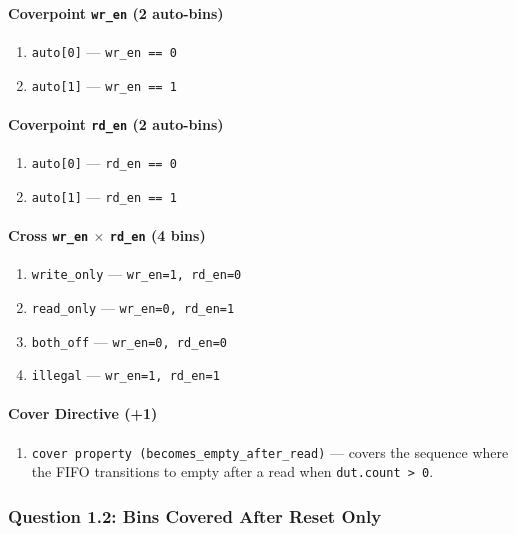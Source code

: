 \documentclass[11pt]{article}
\begin{document}
\paragraph*{Coverpoint \texttt{wr\_en} (2 auto-bins)}
\begin{enumerate}[resume, label=\arabic*.]
  \item \texttt{auto[0]} --- \texttt{wr\_en == 0}
  \item \texttt{auto[1]} --- \texttt{wr\_en == 1}
\end{enumerate}

\paragraph*{Coverpoint \texttt{rd\_en} (2 auto-bins)}
\begin{enumerate}[resume, label=\arabic*.]
  \item \texttt{auto[0]} --- \texttt{rd\_en == 0}
  \item \texttt{auto[1]} --- \texttt{rd\_en == 1}
\end{enumerate}

\paragraph*{Cross \texttt{wr\_en} $\times$ \texttt{rd\_en} (4 bins)}
\begin{enumerate}[resume, label=\arabic*.]
  \item \texttt{write\_only} --- \texttt{wr\_en=1, rd\_en=0}
  \item \texttt{read\_only} --- \texttt{wr\_en=0, rd\_en=1}
  \item \texttt{both\_off} --- \texttt{wr\_en=0, rd\_en=0}
  \item \texttt{illegal} --- \texttt{wr\_en=1, rd\_en=1}
\end{enumerate}

\paragraph*{Cover Directive (+1)}
\begin{enumerate}[resume, label={D1.}]
  \item \texttt{cover property (becomes\_empty\_after\_read)} --- covers the sequence where the FIFO transitions to empty after a read when \texttt{dut.count > 0}.
\end{enumerate}

\subsubsection*{Question 1.2: Bins Covered After Reset Only}
\end{document}
